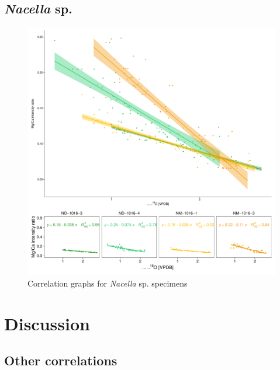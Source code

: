 \documentclass[
  authoryear,
  preprint,
  3p]{elsarticle}
\begin{document}
\subsection{\texorpdfstring{\emph{Nacella}
sp.}{Nacella sp.}}\label{nacella-sp.}

\begin{figure}[H]

{\centering \includegraphics{Manuscript_files/figure-pdf/Nacella_Correlation_Graphs-1.pdf}

}

\caption{Correlation graphs for \emph{Nacella} sp. specimens}

\end{figure}%

\section{Discussion}\label{discussion}

\subsection{Other correlations}\label{other-correlations}
\end{document}
